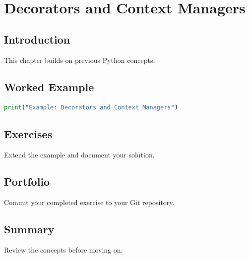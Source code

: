 \chapter{Decorators and Context Managers}
\label{chap:vol3-19}



\section{Introduction}
This chapter builds on previous Python concepts.

\section{Worked Example}
\begin{lstlisting}[language=Python]
print("Example: Decorators and Context Managers")
\end{lstlisting}

\section{Exercises}
\begin{exercise}
Extend the example and document your solution.
\end{exercise}

\section{Portfolio}
Commit your completed exercise to your Git repository.

\section{Summary}
Review the concepts before moving on.
